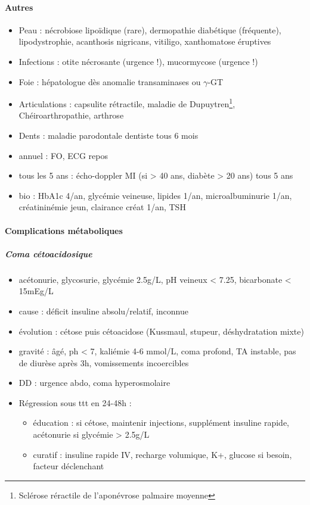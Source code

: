 \documentclass[11pt]{article}
\begin{document}
\paragraph{Autres}
\label{sec:org108882e}
\begin{itemize}
\item Peau : nécrobiose lipoïdique (rare), dermopathie diabétique (fréquente),
lipodystrophie, acanthosis nigricans, vitiligo, xanthomatose éruptives
\item Infections : otite nécrosante (urgence !), mucormycose (urgence !)
\item Foie : hépatologue dès anomalie transaminases ou \(\gamma\)-GT
\item Articulations : capsulite rétractile, maladie de Dupuytren\footnote{Sclérose réractile de l'aponévrose palmaire moyenne}, Chéiroarthropathie, arthrose
\item Dents : maladie parodontale \thus dentiste tous 6 mois
\end{itemize}

\begin{tcolorbox}
\begin{itemize}
 \item annuel : FO, ECG repos 
 \item tous les 5 ans : écho-doppler MI (si > 40 ans, diabète > 20 ans) tous 5 ans
 \item bio : HbA1c 4/an, glycémie veineuse, lipides 1/an, microalbuminurie 1/an,
   créatininémie jeun, clairance créat 1/an, TSH
\end{itemize}
\end{tcolorbox}

\paragraph{Complications métaboliques}
\label{sec:org451d4ed}
\subparagraph{Coma cétoacidosique}
\label{sec:org98e7ec4}
\begin{itemize}
\item acétonurie, glycosurie, glycémie 2.5g/L, pH veineux < 7.25, bicarbonate <
15mEg/L
\item cause : déficit insuline absolu/relatif, inconnue
\item évolution : cétose puis cétoacidose (Kussmaul, stupeur, déshydratation mixte)
\item gravité : âgé, ph < 7, kaliémie 4-6 mmol/L, coma profond, TA instable, pas de
diurèse après 3h, vomissements incoercibles
\item DD : urgence abdo, coma hyperosmolaire
\item Régression sous ttt en 24-48h : 
\begin{itemize}
\item éducation : si cétose, maintenir injections, supplément insuline rapide,
acétonurie si glycémie > 2.5g/L
\item curatif : insuline rapide IV, recharge volumique, K+, glucose
si besoin, facteur déclenchant
\end{itemize}
\end{itemize}
\end{document}
